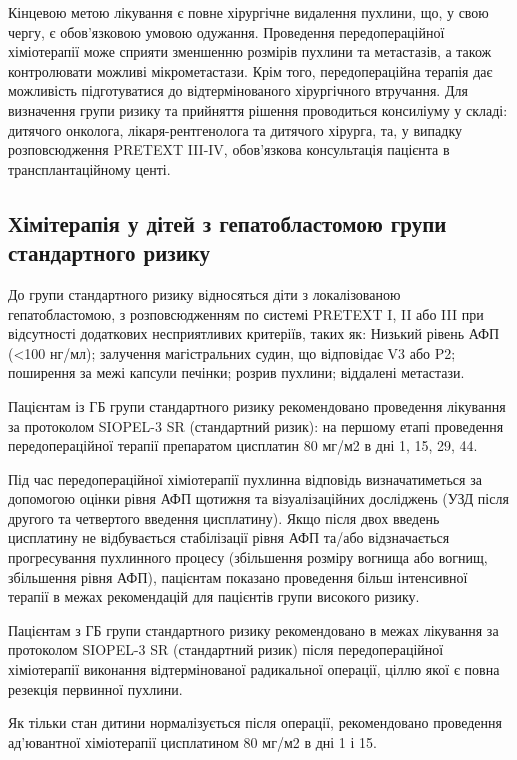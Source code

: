 Кінцевою метою лікування є повне хірургічне видалення пухлини, що, у свою чергу, є обов'язковою умовою одужання. Проведення передопераційної хіміотерапії може сприяти зменшенню розмірів пухлини та метастазів, а також контролювати можливі мікрометастази. Крім того, передопераційна терапія дає можливість підготуватися до відтермінованого хірургічного втручання\cite{pmid31584686}. Для визначення групи ризику та прийняття рішення проводиться консиліуму у складі: дитячого онколога, лікаря-рентгенолога та дитячого хірурга, та, у випадку розповсюдження PRETEXT III-IV, обов'язкова консультація пацієнта в трансплантаційному центі.

\subsection{Хімітерапія у дітей з гепатобластомою групи стандартного ризику}
До групи стандартного ризику відносяться діти з локалізованою гепатобластомою, з розповсюдженням по системі PRETEXT I, II або III при відсутності додаткових несприятливих  критеріїв, таких як: Низький рівень  АФП (<100 нг/мл); залучення магістральних судин, що відповідає V3 або P2; поширення за межі капсули печінки; розрив пухлини; віддалені метастази\cite{pmid31155201}.    

Пацієнтам із ГБ групи стандартного ризику рекомендовано проведення лікування за протоколом SIOPEL-3 SR (стандартний ризик): на першому етапі проведення передопераційної терапії препаратом цисплатин 80 мг/м2 в дні 1, 15, 29, 44.

Під час передопераційної хіміотерапії пухлинна відповідь визначатиметься за допомогою оцінки рівня АФП щотижня та візуалізаційних досліджень (УЗД після другого та четвертого введення цисплатину). Якщо після двох введень цисплатину не відбувається стабілізації рівня АФП та/або відзначається прогресування пухлинного процесу (збільшення розміру вогнища або вогнищ, збільшення рівня АФП), пацієнтам показано проведення більш інтенсивної терапії в межах рекомендацій для пацієнтів групи високого ризику\cite{pmid9494762}.

Пацієнтам з ГБ групи стандартного ризику рекомендовано в межах лікування за протоколом SIOPEL-3 SR (стандартний ризик) після передопераційної хіміотерапії виконання відтермінованої радикальної операції, ціллю якої є повна резекція первинної пухлини. 

Як тільки стан дитини нормалізується після операції, рекомендовано проведення ад'ювантної хіміотерапії цисплатином 80 мг/м2 в дні 1 і 15.


